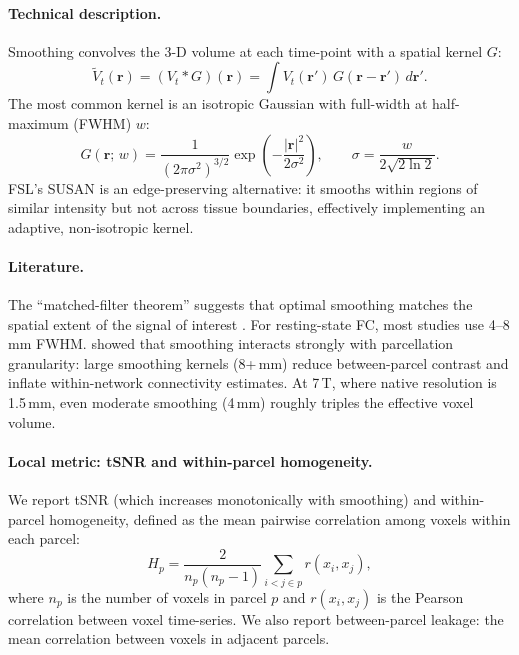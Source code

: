 \documentclass[11pt,a4paper]{article}
\begin{document}
\paragraph{Technical description.}
Smoothing convolves the 3-D volume at each time-point with a spatial kernel $G$:
\begin{equation}
    \tilde{V}_t(\mathbf{r}) = (V_t * G)(\mathbf{r}) = \int V_t(\mathbf{r}') \, G(\mathbf{r} - \mathbf{r}') \, d\mathbf{r}'.
\end{equation}
The most common kernel is an isotropic Gaussian with full-width at half-maximum (FWHM) $w$:
\begin{equation}
    G(\mathbf{r};\, w) = \frac{1}{(2\pi\sigma^2)^{3/2}} \exp\!\left(-\frac{|\mathbf{r}|^2}{2\sigma^2}\right), \qquad \sigma = \frac{w}{2\sqrt{2\ln 2}}.
\end{equation}
FSL's SUSAN \citep{smith1997} is an edge-preserving alternative: it smooths within regions of similar intensity but not across tissue boundaries, effectively implementing an adaptive, non-isotropic kernel.

\paragraph{Literature.}
The ``matched-filter theorem'' suggests that optimal smoothing matches the spatial extent of the signal of interest \citep{worsley1996}.  For resting-state FC, most studies use 4--8\,mm FWHM.  \citet{scheinost2014} showed that smoothing interacts strongly with parcellation granularity: large smoothing kernels (8+\,mm) reduce between-parcel contrast and inflate within-network connectivity estimates.  At 7\,T, where native resolution is 1.5\,mm, even moderate smoothing (4\,mm) roughly triples the effective voxel volume.

\paragraph{Local metric: tSNR and within-parcel homogeneity.}
We report tSNR (which increases monotonically with smoothing) and within-parcel homogeneity, defined as the mean pairwise correlation among voxels within each parcel:
\begin{equation}
    H_p = \frac{2}{n_p(n_p - 1)} \sum_{i < j \in p} r(x_i, x_j),
\end{equation}
where $n_p$ is the number of voxels in parcel $p$ and $r(x_i, x_j)$ is the Pearson correlation between voxel time-series.  We also report between-parcel leakage: the mean correlation between voxels in adjacent parcels.
\end{document}
